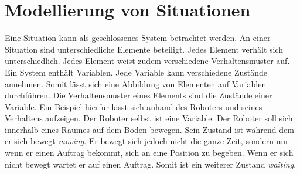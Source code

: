 \section{Modellierung von Situationen}
Eine Situation kann als geschlossenes System betrachtet werden. An einer Situation sind unterschiedliche Elemente beteiligt. Jedes Element verhält sich unterschiedlich. Jedes Element weist zudem verschiedene Verhaltensmuster auf. Ein System enthält Variablen. Jede Variable kann verschiedene Zustände annehmen. Somit lässt sich eine Abbildung von Elementen auf Variablen durchführen. Die Verhaltensmuster eines Elements sind die Zustände einer Variable. Ein Beispiel hierfür lässt sich anhand des Roboters und seines Verhaltens aufzeigen. Der Roboter selbst ist eine Variable. Der Roboter soll sich innerhalb eines Raumes auf dem Boden bewegen. Sein Zustand ist während dem er sich bewegt \textit{moving}. Er bewegt sich jedoch nicht die ganze Zeit, sondern nur wenn er einen Auftrag bekommt, sich an eine Position zu begeben. Wenn er sich nicht bewegt wartet er auf einen Auftrag. Somit ist ein weiterer Zustand \textit{waiting}.

